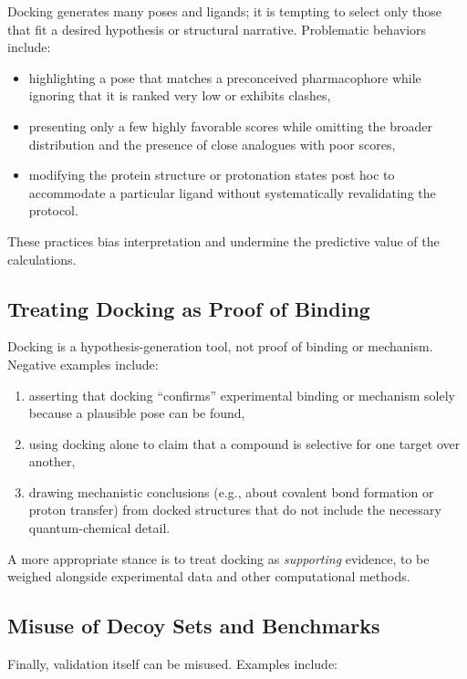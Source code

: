 \documentclass[12pt,a4paper]{article}
\begin{document}
Docking generates many poses and ligands; it is tempting to select only those that fit a desired hypothesis or structural narrative. Problematic behaviors include:

\begin{itemize}
  \item highlighting a pose that matches a preconceived pharmacophore while ignoring that it is ranked very low or exhibits clashes,
  \item presenting only a few highly favorable scores while omitting the broader distribution and the presence of close analogues with poor scores,
  \item modifying the protein structure or protonation states post hoc to accommodate a particular ligand without systematically revalidating the protocol.
\end{itemize}

These practices bias interpretation and undermine the predictive value of the calculations.

\subsection{Treating Docking as Proof of Binding}

Docking is a hypothesis-generation tool, not proof of binding or mechanism. Negative examples include:

\begin{enumerate}
  \item asserting that docking ``confirms'' experimental binding or mechanism solely because a plausible pose can be found,
  \item using docking alone to claim that a compound is selective for one target over another,
  \item drawing mechanistic conclusions (e.g., about covalent bond formation or proton transfer) from docked structures that do not include the necessary quantum-chemical detail.
\end{enumerate}

A more appropriate stance is to treat docking as \emph{supporting} evidence, to be weighed alongside experimental data and other computational methods.

\subsection{Misuse of Decoy Sets and Benchmarks}

Finally, validation itself can be misused. Examples include:
\end{document}
